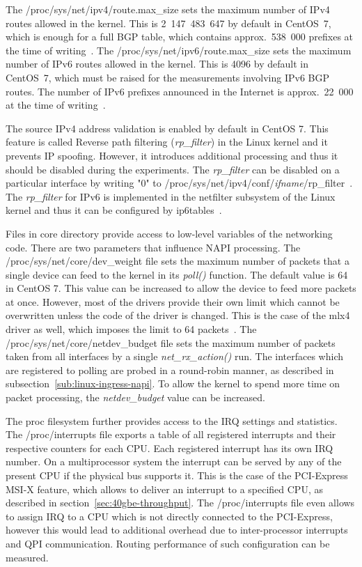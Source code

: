 The /proc/sys/net/ipv4/route.max\_size sets the maximum number of IPv4 routes allowed in the kernel.
This is 2~147~483~647 by default in CentOS~7, which is enough for a full BGP table,
which contains approx.~538~000 prefixes at the time of writing~\cite{bgp-analysis-reports}.
The /proc/sys/net/ipv6/route.max\_size sets the maximum number of IPv6 routes allowed in the kernel.
This is 4096 by default in CentOS~7, which must be raised for the measurements involving IPv6 BGP routes.
The number of IPv6 prefixes announced in the Internet is approx.~22~000 at the time of writing~\cite{bgp-analysis-reports}.

The source IPv4 address validation is enabled by default in CentOS 7.
This feature is called Reverse path filtering ({\it{rp\_filter}}) in the Linux kernel and it prevents IP spoofing.
However, it introduces additional processing and thus it should be disabled during the experiments.
The {\it{rp\_filter}} can be disabled on a particular interface
by writing "0" to /proc/sys/net/ipv4/conf/{\it{ifname}}/rp\_filter~\cite{kernel-doc-ip-sysctl}.
The {\it{rp\_filter}} for IPv6 is implemented in the netfilter subsystem of the Linux kernel and
thus it can be configured by ip6tables~\cite{kernel-source}.

Files in core directory provide access to low-level variables of the networking code.
There are two parameters that influence NAPI processing.
The /proc/sys/net/core/dev\_weight file sets the maximum number of packets that a single device
can feed to the kernel in its {\it{poll()}} function.
The default value is 64 in CentOS 7.
This value can be increased to allow the device to feed more packets at once.
However, most of the drivers provide their own limit which cannot be overwritten unless the code of the driver is changed.
This is the case of the mlx4 driver as well, which imposes the limit to 64 packets~\cite{kernel-source}.
The /proc/sys/net/core/netdev\_budget file sets the
maximum number of packets taken from all interfaces by a single {\it{net\_rx\_action()}} run.
The interfaces which are registered to polling are
probed in a round-robin manner, as described in subsection~\ref{sub:linux-ingress-napi}.
To allow the kernel to spend more time on packet processing, the {\it{netdev\_budget}} value can be increased.

The proc filesystem further provides access to the IRQ settings and statistics.
The /proc/interrupts file exports a table of all registered interrupts and their respective counters for each CPU.
Each registered interrupt has its own IRQ number.
On a multiprocessor system the interrupt can be served by any of the present CPU if the physical bus supports it.
This is the case of the PCI-Express MSI-X feature, which allows to deliver an interrupt to a specified CPU,
as described in section~\ref{sec:40gbe-throughput}.
The /proc/interrupts file even allows to assign IRQ to a CPU which is not directly connected to
the PCI-Express, however this would lead to additional overhead due to inter-processor interrupts and
QPI communication. Routing performance of such configuration can be measured.

